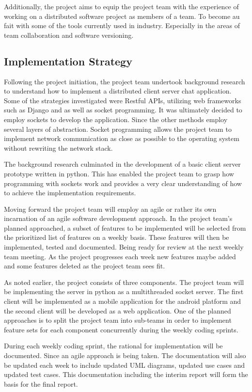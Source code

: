 \documentclass[11pt,a4paper]{article}
\begin{document}
Additionally, the project aims to equip the project team with the experience of working on a distributed software project as members of a team. To become au fait with some of the tools currently used in industry. Especially in the areas of team collaboration and software versioning.

\subsection{Implementation Strategy}
Following the project initiation, the project team undertook background research to understand how to implement a distributed client server chat application. Some of the strategies investigated were Restful APIs, utilizing web frameworks such as Django and as well as socket programming. It was ultimately decided to employ sockets to develop the application. Since the other methods employ several layers of abstraction. Socket programming allows the project team to implement network communication as close as possible to the operating system without rewriting the network stack.


The background research culminated in the development of a basic client server prototype written in python. This has enabled the project team to grasp how programming with sockets work and provides a very clear understanding of how to achieve the implementation requirements.


Moving forward the project team will employ an agile or rather its own incarnation of an agile software development approach. In the project team’s planned approached, a subset of features to be implemented will be selected from the prioritized list of features on a weekly basis. These features will then be implemented, tested and documented. Being ready for review at the next weekly team meeting. As the project progresses each week new features maybe added and some features deleted as the project team sees fit.


As noted earlier, the project consists of three components. The project team will be implementing the server in python as a multithreaded socket server. The first client will be implemented as a mobile application for the android platform and the second client will be developed as a web application. One of the planned approaches is to split the project team into sub-teams in order to implement feature sets for each component concurrently during the weekly coding sprints. 


During each weekly coding sprint, the rational for implementation will be documented. Since an agile approach is being taken. The documentation will also be updated each week to include updated UML diagrams, updated use cases and updated test cases. This documentation including the interim report will form the basis for the final report.
\end{document}
